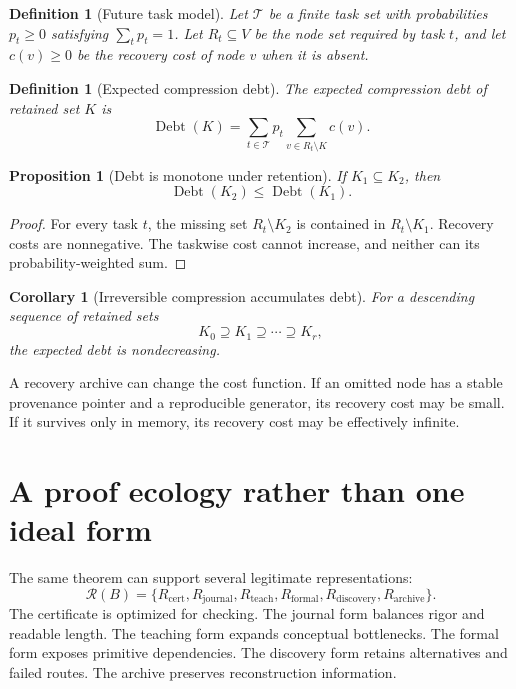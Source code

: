 \documentclass[11pt,oneside]{article}
\theoremstyle{komorebiplain}
\newtheorem{proposition}[theorem]{Proposition}
\newtheorem{corollary}[theorem]{Corollary}
\theoremstyle{komorebidefinition}
\newtheorem{definition}[theorem]{Definition}
\theoremstyle{komorebiremark}
\newcommand{\Rcal}{\mathcal R}
\newcommand{\Tcal}{\mathcal T}
\newcommand{\Debt}{\operatorname{Debt}}
\begin{document}
\begin{definition}[Future task model]
\label{res:10:1}
Let $\Tcal$ be a finite task set with probabilities $p_t\ge0$ satisfying $\sum_t p_t=1$. Let $R_t\subseteq V$ be the node set required by task $t$, and let $c(v)\ge0$ be the recovery cost of node $v$ when it is absent.
\end{definition}

\begin{definition}[Expected compression debt]
\label{res:10:2}
The expected compression debt of retained set $K$ is
\[
\Debt(K)
=
\sum_{t\in\Tcal}p_t
\sum_{v\in R_t\setminus K}c(v).
\]
\end{definition}

\begin{proposition}[Debt is monotone under retention]
\label{res:10:3}
If $K_1\subseteq K_2$, then
\[
\Debt(K_2)\le\Debt(K_1).
\]
\end{proposition}

\begin{proof}
For every task $t$, the missing set $R_t\setminus K_2$ is contained in $R_t\setminus K_1$. Recovery costs are nonnegative. The taskwise cost cannot increase, and neither can its probability-weighted sum.
\end{proof}

\begin{corollary}[Irreversible compression accumulates debt]
\label{res:10:4}
For a descending sequence of retained sets
\[
K_0\supseteq K_1\supseteq\cdots\supseteq K_r,
\]
the expected debt is nondecreasing.
\end{corollary}

A recovery archive can change the cost function. If an omitted node has a stable provenance pointer and a reproducible generator, its recovery cost may be small. If it survives only in memory, its recovery cost may be effectively infinite.


\section{A proof ecology rather than one ideal form}
\label{sec:old11}

The same theorem can support several legitimate representations:
\[
\Rcal(B)=
\{R_{\mathrm{cert}},R_{\mathrm{journal}},R_{\mathrm{teach}},
R_{\mathrm{formal}},R_{\mathrm{discovery}},R_{\mathrm{archive}}\}.
\]
The certificate is optimized for checking. The journal form balances rigor and readable length. The teaching form expands conceptual bottlenecks. The formal form exposes primitive dependencies. The discovery form retains alternatives and failed routes. The archive preserves reconstruction information.
\end{document}
